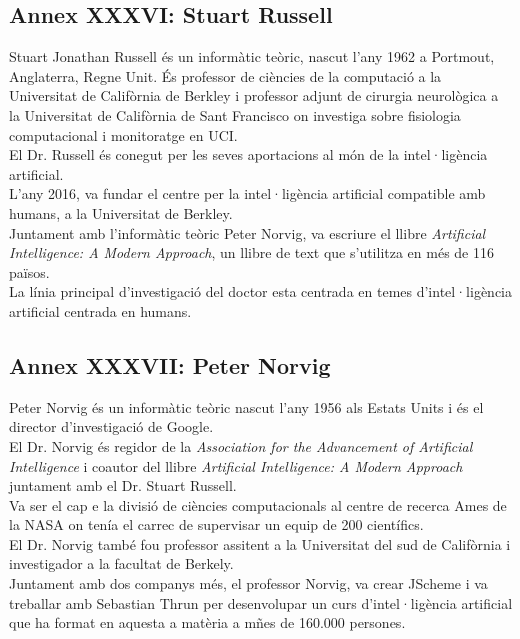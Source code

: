 \documentclass[a4paper,12pt]{article}
\begin{document}
\subsection*{Annex XXXVI: Stuart Russell}
Stuart Jonathan Russell és un informàtic teòric, nascut l'any 1962 a Portmout, Anglaterra, Regne Unit. És professor de ciències de la computació a la Universitat de Califòrnia de Berkley i professor adjunt de cirurgia neurològica a la Universitat de Califòrnia de Sant Francisco on investiga sobre fisiologia computacional i monitoratge en UCI.\\
El Dr. Russell és conegut per les seves aportacions al món de la intel·ligència artificial.\\
L'any 2016, va fundar el centre per la intel·ligència artificial compatible amb humans, a la Universitat de Berkley.\\
Juntament amb l'informàtic teòric Peter Norvig, va escriure el llibre \textit{Artificial Intelligence: A Modern Approach}, un llibre de text que s'utilitza en més de 116 països.\\
La línia principal d'investigació del doctor esta centrada en temes d'intel·ligència artificial centrada en humans.
\subsection*{Annex XXXVII: Peter Norvig}
Peter Norvig és un informàtic teòric nascut l'any 1956 als Estats Units i és el director d'investigació de Google.\\
El Dr. Norvig és regidor de la \textit{Association for the Advancement of Artificial Intelligence} i coautor del llibre \textit{Artificial Intelligence: A Modern Approach} juntament amb el Dr. Stuart Russell.\\
Va ser el cap e la divisió de ciències computacionals al centre de recerca Ames de la NASA on tenía el carrec de supervisar un equip de 200 científics.\\
El Dr. Norvig també fou professor assitent a la Universitat del sud de Califòrnia i investigador a la facultat de Berkely.\\
Juntament amb dos companys més, el professor Norvig, va crear JScheme i va treballar amb Sebastian Thrun per desenvolupar un curs d'intel·ligència artificial que ha format en aquesta a matèria a mñes de 160.000 persones.
\end{document}
